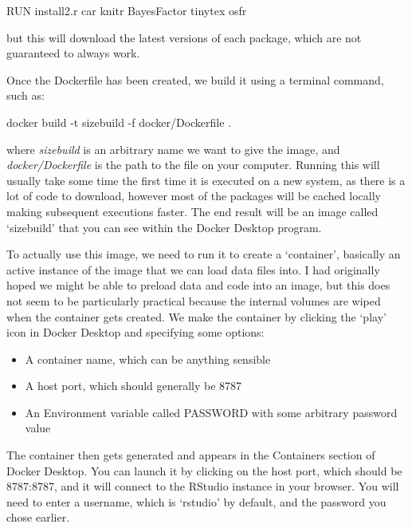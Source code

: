 \documentclass[
]{article}
\newenvironment{Shaded}{\begin{snugshade}}{\end{snugshade}}
\newcommand{\AttributeTok}[1]{\textcolor[rgb]{0.77,0.63,0.00}{#1}}
\newcommand{\ExtensionTok}[1]{#1}
\newcommand{\NormalTok}[1]{#1}
\providecommand{\tightlist}{%
  \setlength{\itemsep}{0pt}\setlength{\parskip}{0pt}}
\begin{document}
\begin{Shaded}
\begin{Highlighting}[]

\ExtensionTok{RUN}\NormalTok{ install2.r car knitr BayesFactor tinytex osfr}
\end{Highlighting}
\end{Shaded}

but this will download the latest versions of each package, which are not guaranteed to always work.

Once the Dockerfile has been created, we build it using a terminal command, such as:

\begin{Shaded}
\begin{Highlighting}[]

\ExtensionTok{docker}\NormalTok{ build }\AttributeTok{{-}t}\NormalTok{ sizebuild }\AttributeTok{{-}f}\NormalTok{ docker/Dockerfile .}
\end{Highlighting}
\end{Shaded}

where \emph{sizebuild} is an arbitrary name we want to give the image, and \emph{docker/Dockerfile} is the path to the file on your computer. Running this will usually take some time the first time it is executed on a new system, as there is a lot of code to download, however most of the packages will be cached locally making subsequent executions faster. The end result will be an image called `sizebuild' that you can see within the Docker Desktop program.

To actually use this image, we need to run it to create a `container', basically an active instance of the image that we can load data files into. I had originally hoped we might be able to preload data and code into an image, but this does not seem to be particularly practical because the internal volumes are wiped when the container gets created. We make the container by clicking the `play' icon in Docker Desktop and specifying some options:

\begin{itemize}
\tightlist
\item
  A container name, which can be anything sensible
\item
  A host port, which should generally be 8787
\item
  An Environment variable called PASSWORD with some arbitrary password value
\end{itemize}

The container then gets generated and appears in the Containers section of Docker Desktop. You can launch it by clicking on the host port, which should be 8787:8787, and it will connect to the RStudio instance in your browser. You will need to enter a username, which is `rstudio' by default, and the password you chose earlier.
\end{document}
